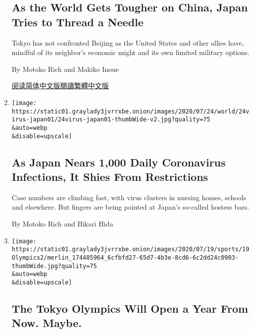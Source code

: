 \begin{enumerate}
{  \subsection{As the World Gets Tougher on China, Japan Tries to Thread
  a
  Needle}\label{as-the-world-gets-tougher-on-china-japan-tries-to-thread-a-needle}}

  Tokyo has not confronted Beijing as the United States and other allies
  have, mindful of its neighbor's economic might and its own limited
  military options.

  By Motoko Rich and Makiko Inoue

  \href{https://cn.nytimes3xbfgragh.onion/asia-pacific/20200727/japan-china-xi/}{阅读简体中文版}\href{https://cn.nytimes3xbfgragh.onion/asia-pacific/20200727/japan-china-xi/zh-hant/}{閱讀繁體中文版}
\item
  \href{/2020/07/24/world/asia/japan-coronavirus.html}{}

  \texttt{[image: https://static01.graylady3jvrrxbe.onion/images/2020/07/24/world/24virus-japan01/24virus-japan01-thumbWide-v2.jpg?quality=75\\\&auto=webp\\\&disable=upscale]}

  \hypertarget{as-japan-nears-1000-daily-coronavirus-infections-it-shies-from-restrictions}{%
  \subsection{As Japan Nears 1,000 Daily Coronavirus Infections, It
  Shies From
  Restrictions}\label{as-japan-nears-1000-daily-coronavirus-infections-it-shies-from-restrictions}}

  Case numbers are climbing fast, with virus clusters in nursing homes,
  schools and elsewhere. But fingers are being pointed at Japan's
  so-called hostess bars.

  By Motoko Rich and Hikari Hida
\item
  \href{/2020/07/19/sports/2021-tokyo-olympics-protocols.html}{}

  \texttt{[image: https://static01.graylady3jvrrxbe.onion/images/2020/07/19/sports/19Olympics2/merlin\_174485964\_6cfbfd27-65d7-4b3e-8cd6-6c2dd24c0903-thumbWide.jpg?quality=75\\\&auto=webp\\\&disable=upscale]}

  \hypertarget{the-tokyo-olympics-will-open-a-year-from-now-maybe}{%
  \subsection{The Tokyo Olympics Will Open a Year From Now.
  Maybe.}\label{the-tokyo-olympics-will-open-a-year-from-now-maybe}}


\end{enumerate}

